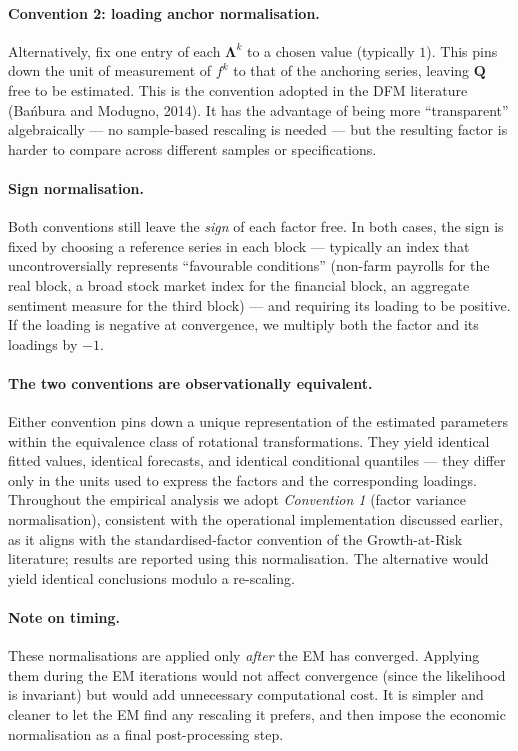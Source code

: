 \documentclass[11pt, a4paper, oneside]{article}
\newcommand{\mL}{\boldsymbol{\Lambda}}
\begin{document}
\paragraph{Convention 2: loading anchor normalisation.}
Alternatively, fix one entry of each $\mL^k$ to a chosen value
(typically $1$). This pins down the unit of measurement of $f^k$ to
that of the anchoring series, leaving $\mathbf{Q}$ free to be
estimated. This is the convention adopted in the DFM literature
(Bańbura and Modugno, 2014). It has the advantage of being more
``transparent'' algebraically — no sample-based rescaling is needed
— but the resulting factor is harder to compare across different
samples or specifications.

\paragraph{Sign normalisation.}
Both conventions still leave the \emph{sign} of each factor free. In
both cases, the sign is fixed by choosing a reference series in each
block — typically an index that uncontroversially represents
``favourable conditions'' (non-farm payrolls for the real block, a
broad stock market index for the financial block, an aggregate
sentiment measure for the third block) — and requiring its loading
to be positive. If the loading is negative at convergence, we
multiply both the factor and its loadings by $-1$.

\paragraph{The two conventions are observationally equivalent.}
Either convention pins down a unique representation of the
estimated parameters within the equivalence class of rotational
transformations. They yield identical fitted values, identical
forecasts, and identical conditional quantiles — they differ only in
the units used to express the factors and the corresponding
loadings. Throughout the empirical analysis we adopt
\emph{Convention 1} (factor variance normalisation), consistent with the operational implementation discussed earlier, as it aligns
with the standardised-factor convention of the Growth-at-Risk
literature; results are reported using this normalisation. The
alternative would yield identical conclusions modulo a re-scaling.

\paragraph{Note on timing.}
These normalisations are applied only \emph{after} the EM has
converged. Applying them during the EM iterations would not affect
convergence (since the likelihood is invariant) but would add
unnecessary computational cost. It is simpler and cleaner to let the
EM find any rescaling it prefers, and then impose the economic
normalisation as a final post-processing step.
\end{document}
